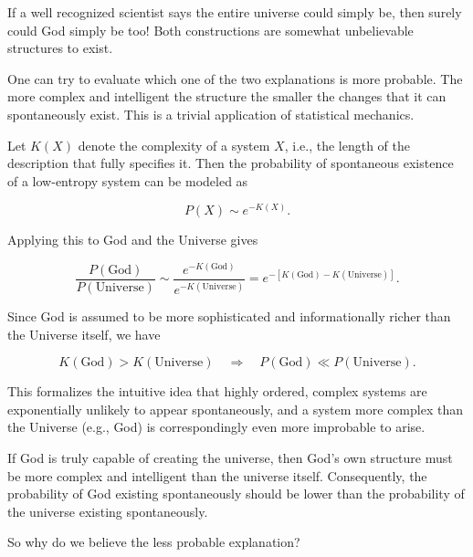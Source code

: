 If a well recognized scientist says the entire universe 
could simply be, then surely could God simply be too! Both constructions 
are somewhat unbelievable structures to exist.

One can try to evaluate which one of the two explanations is more probable.
The more complex and intelligent the structure the smaller the changes
that it can spontaneously exist. This is a trivial application of statistical mechanics.

Let \(K(X)\) denote the complexity of a system \(X\), i.e.,
the length of the description that fully specifies it. Then the probability of spontaneous
existence of a low-entropy system can be modeled as

\[
P(X) \sim e^{-K(X)}.
\]

Applying this to God and the Universe gives

\[
\frac{P(\text{God})}{P(\text{Universe})} \sim 
\frac{e^{-K(\text{God})}}{e^{-K(\text{Universe})}} 
= e^{-[K(\text{God}) - K(\text{Universe})]}.
\]

Since God is assumed to be more sophisticated and informationally richer than the Universe itself, we have

\[
K(\text{God}) > K(\text{Universe}) \quad \Rightarrow \quad P(\text{God}) \ll P(\text{Universe}).
\]

This formalizes the intuitive idea that highly ordered, complex systems are exponentially unlikely to appear spontaneously, and a system more complex than the Universe (e.g., God) is correspondingly even more improbable to arise.

If God is truly capable of creating the universe, then God’s own structure must be more complex and intelligent than the universe itself. Consequently, the probability of God existing spontaneously should be lower than the probability of the universe existing spontaneously.

So why do we believe the less probable explanation?

